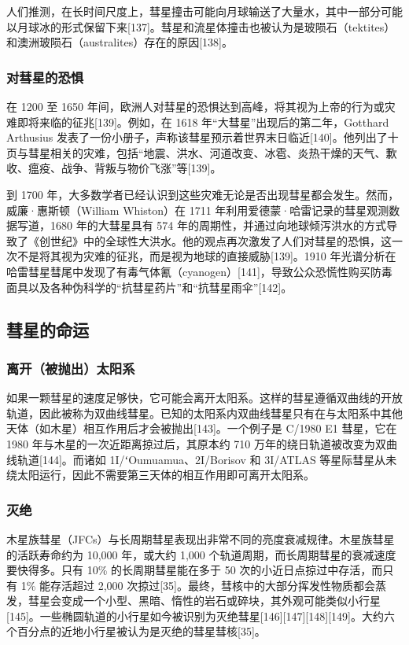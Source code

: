 人们推测，在长时间尺度上，彗星撞击可能向月球输送了大量水，其中一部分可能以月球冰的形式保留下来[137]。彗星和流星体撞击也被认为是玻陨石（tektites）和澳洲玻陨石（australites）存在的原因[138]。
\subsubsection{对彗星的恐惧}
在 1200 至 1650 年间，欧洲人对彗星的恐惧达到高峰，将其视为上帝的行为或灾难即将来临的征兆[139]。例如，在 1618 年“大彗星”出现后的第二年，Gotthard Arthusius 发表了一份小册子，声称该彗星预示着世界末日临近[140]。他列出了十页与彗星相关的灾难，包括“地震、洪水、河道改变、冰雹、炎热干燥的天气、歉收、瘟疫、战争、背叛与物价飞涨”等[139]。

到 1700 年，大多数学者已经认识到这些灾难无论是否出现彗星都会发生。然而，威廉·惠斯顿（William Whiston）在 1711 年利用爱德蒙·哈雷记录的彗星观测数据写道，1680 年的大彗星具有 574 年的周期性，并通过向地球倾泻洪水的方式导致了《创世纪》中的全球性大洪水。他的观点再次激发了人们对彗星的恐惧，这一次不是将其视为灾难的征兆，而是视为地球的直接威胁[139]。1910 年光谱分析在哈雷彗星彗尾中发现了有毒气体氰（cyanogen）[141]，导致公众恐慌性购买防毒面具以及各种伪科学的“抗彗星药片”和“抗彗星雨伞”[142]。
\subsection{彗星的命运}
\subsubsection{离开（被抛出）太阳系}
如果一颗彗星的速度足够快，它可能会离开太阳系。这样的彗星遵循双曲线的开放轨道，因此被称为双曲线彗星。已知的太阳系内双曲线彗星只有在与太阳系中其他天体（如木星）相互作用后才会被抛出[143]。一个例子是 C/1980 E1 彗星，它在 1980 年与木星的一次近距离掠过后，其原本约 710 万年的绕日轨道被改变为双曲线轨道[144]。而诸如 1I/ʻOumuamua、2I/Borisov 和 3I/ATLAS 等星际彗星从未绕太阳运行，因此不需要第三天体的相互作用即可离开太阳系。
\subsubsection{灭绝}
木星族彗星（JFCs）与长周期彗星表现出非常不同的亮度衰减规律。木星族彗星的活跃寿命约为 10,000 年，或大约 1,000 个轨道周期，而长周期彗星的衰减速度要快得多。只有 10\% 的长周期彗星能在多于 50 次的小近日点掠过中存活，而只有 1\% 能存活超过 2,000 次掠过[35]。最终，彗核中的大部分挥发性物质都会蒸发，彗星会变成一个小型、黑暗、惰性的岩石或碎块，其外观可能类似小行星[145]。一些椭圆轨道的小行星如今被识别为灭绝彗星[146][147][148][149]。大约六个百分点的近地小行星被认为是灭绝的彗星彗核[35]。
